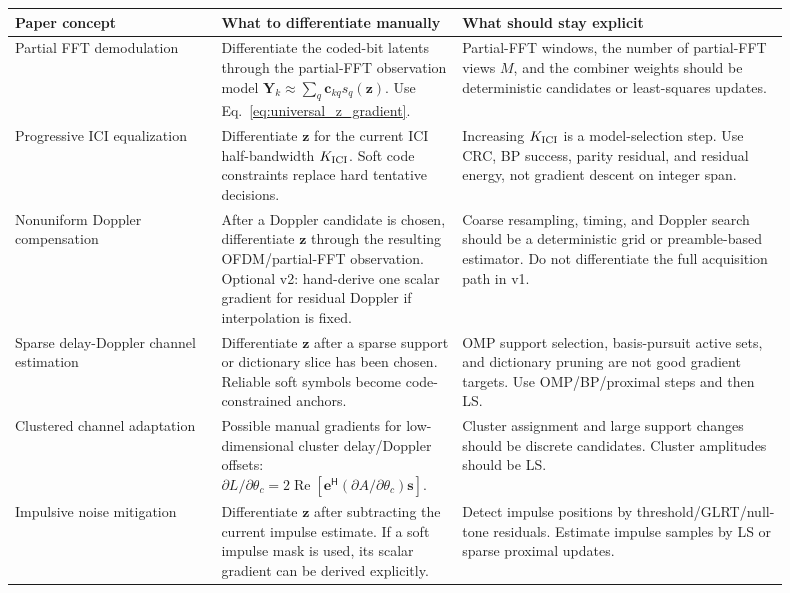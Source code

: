 \documentclass[11pt]{article}
\newcommand{\Hh}{^{\mathsf H}}
\newcommand{\Ree}{\operatorname{Re}}
\begin{document}
\begin{longtable}{@{}>{\raggedright\arraybackslash}p{0.24\linewidth}>{\raggedright\arraybackslash}p{0.28\linewidth}>{\raggedright\arraybackslash}p{0.38\linewidth}@{}}
\toprule
Paper concept & What to differentiate manually & What should stay explicit \\
\midrule
Partial FFT demodulation
& Differentiate the coded-bit latents through the partial-FFT observation model
$\bm Y_k\approx\sum_q \bm c_{kq}s_q(\bm z)$.  Use
Eq.~\eqref{eq:universal_z_gradient}.
& Partial-FFT windows, the number of partial-FFT views $M$, and the combiner weights should be
deterministic candidates or least-squares updates. \\

Progressive ICI equalization
& Differentiate $\bm z$ for the current ICI half-bandwidth
$K_{\rm ICI}$.  Soft code constraints replace hard tentative decisions.
& Increasing $K_{\rm ICI}$ is a model-selection step.  Use CRC, BP success,
parity residual, and residual energy, not gradient descent on integer span. \\

Nonuniform Doppler compensation
& After a Doppler candidate is chosen, differentiate $\bm z$ through the
resulting OFDM/partial-FFT observation.  Optional v2: hand-derive one scalar
gradient for residual Doppler if interpolation is fixed.
& Coarse resampling, timing, and Doppler search should be a deterministic grid
or preamble-based estimator.  Do not differentiate the full acquisition path in
v1. \\

Sparse delay-Doppler channel estimation
& Differentiate $\bm z$ after a sparse support or dictionary slice has been
chosen.  Reliable soft symbols become code-constrained anchors.
& OMP support selection, basis-pursuit active sets, and dictionary pruning are
not good gradient targets.  Use OMP/BP/proximal steps and then LS. \\

Clustered channel adaptation
& Possible manual gradients for low-dimensional cluster delay/Doppler offsets:
$\partial L/\partial\theta_c=2\Ree[\bm e\Hh(\partial A/\partial\theta_c)\bm s]$.
& Cluster assignment and large support changes should be discrete candidates.
Cluster amplitudes should be LS. \\

Impulsive noise mitigation
& Differentiate $\bm z$ after subtracting the current impulse estimate.  If a
soft impulse mask is used, its scalar gradient can be derived explicitly.
& Detect impulse positions by threshold/GLRT/null-tone residuals.  Estimate
impulse samples by LS or sparse proximal updates. \\


\end{longtable}
\end{document}
